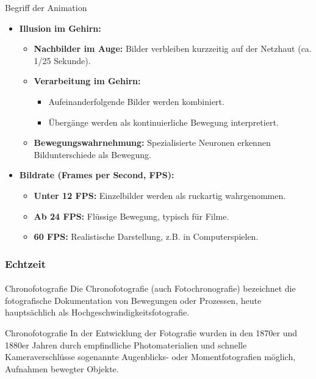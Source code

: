 \documentclass{beamer}
\begin{document}
\begin{frame}{Begriff der Animation}
    \begin{itemize}
      \item \textbf{Illusion im Gehirn:}
      \begin{itemize}
        \item \textbf{Nachbilder im Auge:} Bilder verbleiben kurzzeitig auf der Netzhaut (ca. 1/25 Sekunde).
        \item \textbf{Verarbeitung im Gehirn:} 
        \begin{itemize}
          \item Aufeinanderfolgende Bilder werden kombiniert.
          \item Übergänge werden als kontinuierliche Bewegung interpretiert.
        \end{itemize} 
        \item \textbf{Bewegungswahrnehmung:} Spezialisierte Neuronen erkennen Bildunterschiede als Bewegung.
      \end{itemize}
      \item \textbf{Bildrate (Frames per Second, FPS):}
      \begin{itemize}
        \item \textbf{Unter 12 FPS:} Einzelbilder werden als ruckartig wahrgenommen.
        \item \textbf{Ab 24 FPS:} Flüssige Bewegung, typisch für Filme.
        \item \textbf{60 FPS:} Realistische Darstellung, z.B. in Computerspielen.
      \end{itemize}
    \end{itemize}
  \end{frame}
  

  \begin{frame}
    \frametitle{Echtzeit}
\framesubtitle{}
    \begin{block}{Chronofotografie}
        Die Chronofotografie (auch Fotochronografie) bezeichnet die fotografische Dokumentation von Bewegungen oder Prozessen, heute hauptsächlich als Hochgeschwindigkeitsfotografie. 
\end{block}

\begin{block}{Chronofotografie}
    In der Entwicklung der Fotografie wurden in den 1870er und 1880er Jahren durch empfindliche Photomaterialien und schnelle Kameraverschlüsse sogenannte Augenblicks- oder Momentfotografien möglich, Aufnahmen bewegter Objekte.
\end{block}
\end{frame}
\end{document}
